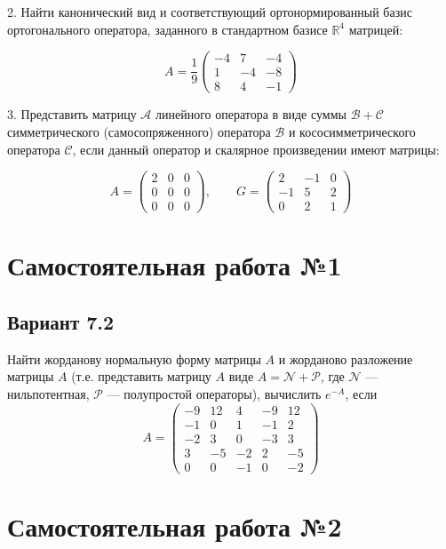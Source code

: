 \documentclass[a4paper]{article}
\def\No{№}
\begin{document}
2. Найти канонический вид и соответствующий ортонормированный
базис ортогонального оператора, заданного в стандартном базисе
$\mathbb{R}^4$ матрицей:

$$ A= \frac{1}{9}\left(
\begin{array}{rrr}
-4 & 7 & -4 \\
1 & -4 & -8 \\
8 & 4 & -1
\end{array} \right)  $$

3. Представить матрицу $\mathcal{A}$ линейного оператора в виде
суммы $\mathcal{B+C}$ симметрического (самосопряженного) оператора
$\mathcal{B}$ и кососимметрического оператора $\mathcal{C}$, если
данный оператор и скалярное произведении имеют матрицы:

$$ A= \left(
\begin{array}{rrr}
2 & 0 & 0 \\
0 & 0 & 0  \\
0 & 0 & 0
\end{array} \right)  ,\qquad G=
\left(
\begin{array}{rrr}
2& -1 & 0\\
-1 & 5 & 2 \\
0 & 2 & 1
\end{array} \right)  $$

\section{Самостоятельная работа \No 1}

\subsection{Вариант 7.2}

Найти жорданову нормальную форму матрицы $A$ и жорданово
разложение матрицы $A$ (т.е. представить матрицу $A$ виде
$A=\mathcal{N} + \mathcal{P}$, где $\mathcal{N}$
--- нильпотентная, $\mathcal{P}$ --- полупростой операторы),
вычислить $e^{-A}$, если
$$
A= \left(
\begin{array}{rrrrr}
-9 & 12 & 4 & -9 & 12 \\
-1 & 0 & 1 & -1 & 2 \\
-2 & 3 & 0 & -3 & 3 \\
3  & -5&-2 &  2 & -5 \\
0 & 0&  -1 & 0  &-2
\end{array} \right)
$$


\section{Самостоятельная работа \No 2}
\end{document}
